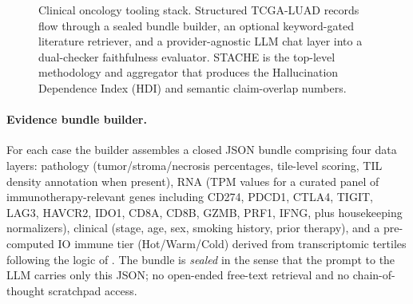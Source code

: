\documentclass[11pt]{article}
\begin{document}
\begin{figure}[t]
\centering
{}
\caption{Clinical oncology tooling stack. Structured TCGA-LUAD records flow through a sealed bundle builder, an optional keyword-gated literature retriever, and a provider-agnostic LLM chat layer into a dual-checker faithfulness evaluator. STACHE is the top-level methodology and aggregator that produces the Hallucination Dependence Index (HDI) and semantic claim-overlap numbers.}
\label{fig:system}
\end{figure}

\paragraph{Evidence bundle builder.}
For each case the builder assembles a closed JSON bundle comprising four data layers: pathology (tumor/stroma/necrosis percentages, tile-level scoring, TIL density annotation when present), RNA (TPM values for a curated panel of immunotherapy-relevant genes including CD274, PDCD1, CTLA4, TIGIT, LAG3, HAVCR2, IDO1, CD8A, CD8B, GZMB, PRF1, IFNG, plus housekeeping normalizers), clinical (stage, age, sex, smoking history, prior therapy), and a pre-computed IO immune tier (Hot/Warm/Cold) derived from transcriptomic tertiles following the logic of \citet{thorsson2018immune}. The bundle is \emph{sealed} in the sense that the prompt to the LLM carries only this JSON; no open-ended free-text retrieval and no chain-of-thought scratchpad access.
\end{document}
